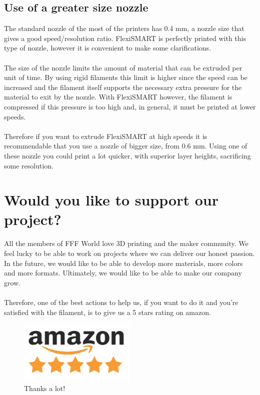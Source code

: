 \documentclass[11pt,a4paper]{article}
\begin{document}
	\subsection{Use of a greater size nozzle}
The standard nozzle of the most of the printers has 0.4 mm, a nozzle size that gives a good speed/resolution ratio. FlexiSMART is perfectly printed with this type of nozzle, however it is convenient to make some clarifications.
\\\\
The size of the nozzle limits the amount of material that can be extruded per unit of time. By using rigid filaments this limit is higher since the speed can be increased and the filament itself supports the necessary extra pressure for the material to exit by the nozzle. With FlexiSMART however, the filament is compressed if this pressure is too high and, in general, it must be printed at lower speeds.
\\\\
Therefore if you want to extrude FlexiSMART at high speeds it is recommendable that you use a nozzle of bigger size, from 0.6 mm. Using one of these nozzle you could print a lot quicker, with superior layer heights, sacrificing some resolution.
\section{Would you like to support our project?}
All the members of FFF World love 3D printing and the maker community. We feel lucky to be able to work on projects where we can deliver our honest passion. In the future, we would like to be able to develop more materials, more colors and more formats. Ultimately, we would like to be able to make our company grow.
\\\\
Therefore, one of the best actions to help us, if you want to do it and you’re satisfied with the filament, is to give us a 5 stars rating on amazon.
\begin{figure}[H]
\centering
\includegraphics[width=0.5\textwidth,cfbox=azul_marcos 1pt 0pt]{FOTOS/AMAZON_FIVE_STARS}
\caption*{Thanks a lot!}
\end{figure}
\end{document}
